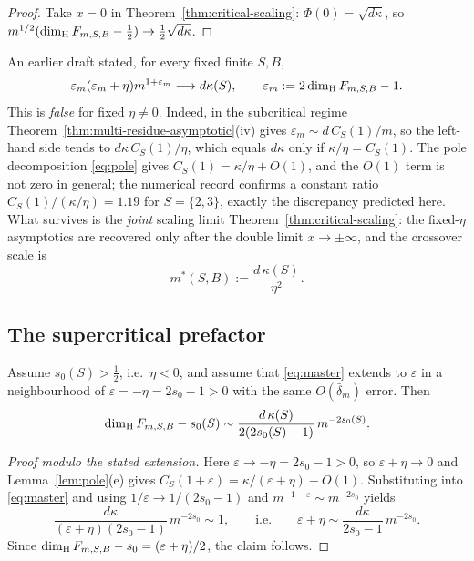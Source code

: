 \begin{proof}
Take $x=0$ in Theorem~\ref{thm:critical-scaling}: $\Phi(0)=\sqrt{d\kappa}$, so
$m^{1/2}(\dim_{\mathrm{H}} F_{m,S,B}-\frac12)\to\frac12\sqrt{d\kappa}$.
\end{proof}

\begin{remark}\label{rem:naive-C2-false}
An earlier draft stated, for every fixed finite $S,B$,
\[
\varepsilon_m(\varepsilon_m+\eta)m^{1+\varepsilon_m}\longrightarrow d\kappa(S),
\qquad \varepsilon_m:=2\dim_{\mathrm{H}} F_{m,S,B}-1 .
\]
This is \emph{false} for fixed $\eta\ne0$. Indeed, in the subcritical regime
Theorem~\ref{thm:multi-residue-asymptotic}(iv) gives
$\varepsilon_m\sim d\,C_S(1)/m$, so the left-hand side tends to
$d\kappa\,C_S(1)/\eta$, which equals $d\kappa$ only if
$\kappa/\eta=C_S(1)$. The pole decomposition \eqref{eq:pole} gives
$C_S(1)=\kappa/\eta+O(1)$, and the $O(1)$ term is not zero in general; the
numerical record confirms a constant ratio
$C_S(1)/(\kappa/\eta)=1.19$ for $S=\{2,3\}$, exactly the discrepancy predicted
here. What survives is the \emph{joint} scaling limit
Theorem~\ref{thm:critical-scaling}: the fixed-$\eta$ asymptotics are recovered
only after the double limit $x\to\pm\infty$, and the crossover scale is
\[
m^*(S,B):=\frac{d\,\kappa(S)}{\eta^2}.
\]
\end{remark}

\subsection{The supercritical prefactor}

\begin{proposition}\label{prop:supercritical-constant}
Assume $s_0(S)>\frac12$, i.e.\ $\eta<0$, and assume that
\eqref{eq:master} extends to $\varepsilon$ in a neighbourhood of
$\varepsilon=-\eta=2s_0-1>0$ with the same $O(\bar\delta_m)$ error. Then
\[
\dim_{\mathrm{H}} F_{m,S,B}-s_0(S)\sim
\frac{d\,\kappa(S)}{2(2s_0(S)-1)}\,m^{-2s_0(S)} .
\]
\end{proposition}

\begin{proof}[Proof modulo the stated extension]
Here $\varepsilon\to-\eta=2s_0-1>0$, so $\varepsilon+\eta\to0$ and
Lemma~\ref{lem:pole}(e) gives
$C_S(1+\varepsilon)=\kappa/(\varepsilon+\eta)+O(1)$. Substituting into
\eqref{eq:master} and using $1/\varepsilon\to1/(2s_0-1)$ and
$m^{-1-\varepsilon}\sim m^{-2s_0}$ yields
\[
\frac{d\kappa}{(\varepsilon+\eta)(2s_0-1)}\,m^{-2s_0}\sim1,
\qquad\text{i.e.}\qquad
\varepsilon+\eta\sim\frac{d\kappa}{2s_0-1}\,m^{-2s_0}.
\]
Since $\dim_{\mathrm{H}} F_{m,S,B}-s_0=(\varepsilon+\eta)/2$, the claim follows.
\end{proof}

